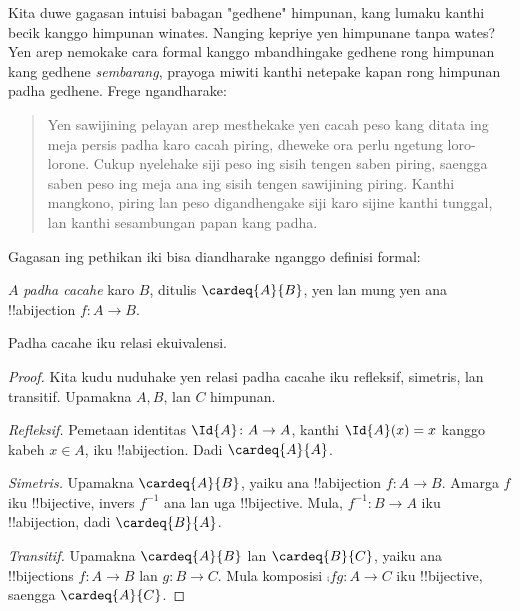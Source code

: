 \documentclass[../../../include/open-logic-section]{subfiles}
\begin{document}


Kita duwe gagasan intuisi babagan "gedhene" himpunan, kang lumaku kanthi
becik kanggo himpunan winates. Nanging kepriye yen himpunane tanpa wates?
Yen arep nemokake cara formal kanggo mbandhingake gedhene rong himpunan
kang gedhene \emph{sembarang}, prayoga miwiti kanthi netepake kapan
rong himpunan padha gedhene. Frege ngandharake:
\begin{quote}
  Yen sawijining pelayan arep mesthekake yen cacah peso kang ditata ing meja
  persis padha karo cacah piring, dheweke ora perlu ngetung loro-lorone.
  Cukup nyelehake siji peso ing sisih tengen saben piring, saengga saben
  peso ing meja ana ing sisih tengen sawijining piring. Kanthi mangkono,
  piring lan peso digandhengake siji karo sijine kanthi tunggal,
  lan kanthi sesambungan papan kang padha. \citep[\S70]{Frege1884}
\end{quote}
Gagasan ing pethikan iki bisa diandharake nganggo definisi formal:

\begin{defn}
  $A$ \emph{padha cacahe} karo $B$, ditulis $\cardeq{A}{B}$,
  yen lan mung yen ana !!a{bijection} $f \colon A \to B$.
\end{defn}

\begin{prop}
Padha cacahe iku relasi ekuivalensi.
\end{prop}

\begin{proof}
Kita kudu nuduhake yen relasi padha cacahe iku refleksif, simetris,
lan transitif. Upamakna $A, B$, lan $C$ himpunan.

\emph{Refleksif.} Pemetaan identitas $\Id{A} \colon A \to A$, kanthi
$\Id{A} (x) = x$ kanggo kabeh $x \in A$, iku !!a{bijection}.
Dadi $\cardeq{A}{A}$.

\emph{Simetris.} Upamakna $\cardeq{A}{B}$, yaiku ana
!!a{bijection} $f\colon A \to B$. Amarga $f$ iku !!{bijective},
invers $f^{-1}$ ana lan uga !!{bijective}. Mula,
$f^{-1}\colon B \to A$ iku !!a{bijection}, dadi $\cardeq{B}{A}$.

\emph{Transitif.} Upamakna $\cardeq{A}{B}$ lan $\cardeq{B}{C}$,
yaiku ana !!{bijection}s $f\colon A \to B$ lan $g\colon B \to
C$. Mula komposisi $\comp{f}{g}\colon A \to C$ iku !!{bijective},
saengga $\cardeq{A}{C}$.
\end{proof}
\end{document}
